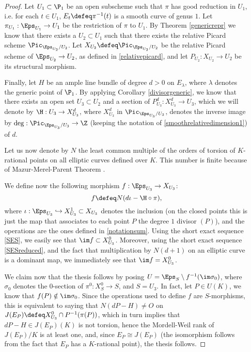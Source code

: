 \begin{proof}
	Let $U_1 \subset \P_1$ be an open subscheme such that $\pi$ has good reduction in $U_1$, i.e. for each $t \in U_1$, $E_t\defeq \pi^{-1}(t)$ is a smooth curve of genus $1$. Let $\pi_{U_1}:\Eps_{U_1} \rightarrow U_1$ be the restriction of $\pi$ to $U_1$. By Theorem \ref{genericrepr} we know that there exists a $U_2 \subset U_1$ such that there exists the relative Picard scheme $\Pic_{\Eps_{U_2}/U_2}$. Let $X_{U_2} \defeq \Pic_{\Eps_{U_2}/U_2}$ be the relative Picard scheme of $\Eps_{U_2}\rightarrow U_2$, as defined in \ref{relativepicard}, and let $P_{U_2}:X_{U_2}\rightarrow U_2$ be its structural morphism. 
	
	Finally, let $H$ be an ample line bundle of degree $d > 0$ on $E_{\lambda}$, where $\lambda$ denotes the generic point of $\P_1$. By applying Corollary \ref{divisorgeneric}, we know that there exists an open set $U_3\subset U_2$ and a section of $P_{U_3}^d:X_{U_3}^{d} \rightarrow U_3$, which we will denote by $\H:U_3 \rightarrow X_{U_3}^{d}$, where $X_{U_3}^d$ in $\Pic_{\Eps_{U_3}/U_3}$, denotes the inverse image by $\deg:\Pic_{\Eps_{U_3}/U_3} \rightarrow \Z$ (keeping the notation of \ref{smoothrelativedimension1}) of $d$.
	
	Let us now denote by $N$ the least common multiple of the orders of torsion of $K$-rational points on all elliptic curves defined over $K$. This number is finite because of Mazur-Merel-Parent Theorem \cite{merel}.
	
	We define now the following morphism $f: \Eps_{U_3} \rightarrow X_{U_3}$:
	\begin{equation}
	f \defeq N(d\iota - \H \circ \pi),
	\end{equation}
	where $\iota: \Eps_{U_3} \hookrightarrow X^1_{U_3} \subset X_{U_3}$ denotes the inclusion (on the closed points this is just the map that associates to each point $P$ the degree $1$ divisor $(P)$), and the operations are the ones defined in \ref{notationsum}. Using the short exact sequence \ref{SES}, we easily see that $\im f \subset X^0_{U_3}$. Moreover, using the short exact sequence \ref{SESreduced}, and the fact that multiplication by $N(d+1)$ on an elliptic curve is a dominant map, we immediately see that $\im f=X^0_{U_3}$.
	
	We claim now that the thesis follows by posing $U=\Eps_S\setminus f^{-1}(\im \sigma_0)$, where $\sigma_0$ denotes the $0$-section of $\pi^0:X_S^0 \rightarrow S$, and $S=U_3$. In fact, let $P \in U(K)$, we know that $f(P) \notin \im \sigma_0$. Since the operations used to define $f$ are $S$-morphisms, this is equivalent to saying that $N(dP-H)\neq O$ on $J(E_P)\defeq X^0_{U_3}\cap P^{-1}(\pi(P))$, which in turn implies that $dP-H \in J(E_P)(K)$ is not torsion, hence the Mordell-Weil rank of $J(E_P)/K$ is at least one, and, since $E_P \cong J(E_P)$ (the isomorphism follows from the fact that $E_P$ has a $K$-rational point), the thesis follows.
\end{proof}

